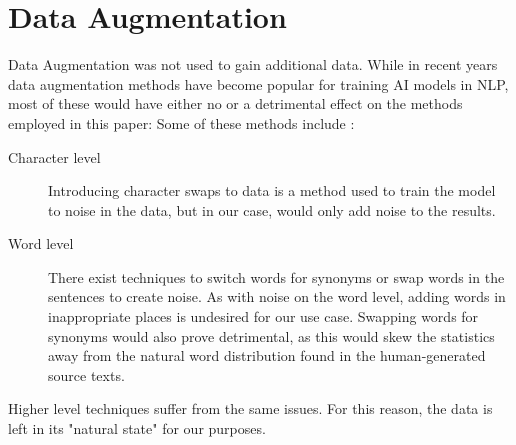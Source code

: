 \section{Data Augmentation}
Data Augmentation was not used to gain additional data.
While in recent years data augmentation methods have become popular for training AI models in NLP, most of these would have either no or a detrimental effect on the methods employed in this paper:
Some of these methods include \cite{pellicerDataAugmentationTechniques2023}:
\begin{description}
	\item[Character level]
	      Introducing character swaps to data is a method used to train the model to noise in the data, but in our case, would only add noise to the results.
	\item[Word level]
	      There exist techniques to switch words for synonyms or swap words in the sentences to create noise.
	      As with noise on the word level, adding words in inappropriate places is undesired for our use case.
	      Swapping words for synonyms would also prove detrimental, as this would skew the statistics away from the natural word distribution found in the human-generated source texts.
\end{description}
Higher level techniques suffer from the same issues.
For this reason, the data is left in its "natural state" for our purposes.
